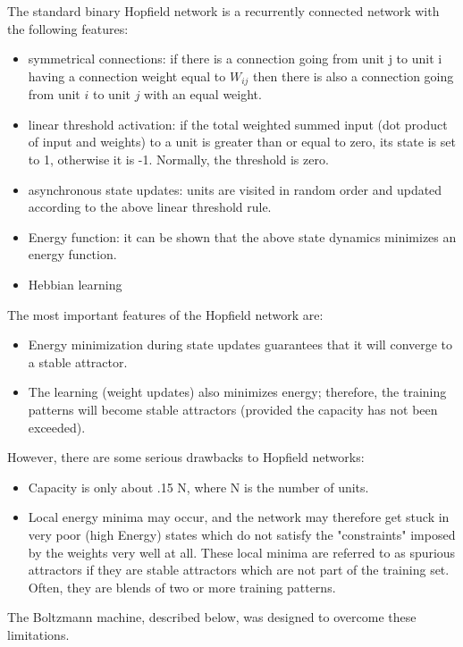 The standard binary Hopfield network is a recurrently connected network with the following features:
\begin{itemize}
\item symmetrical connections: if there is a connection going from unit j to unit i having a connection weight equal to $W_{ij}$ then there is also a connection going from unit $i$ to unit $j$ with an equal weight.
\item linear threshold activation: if the total weighted summed input (dot product of input and weights) to a unit is greater than or equal to zero, its state is set to 1, otherwise it is -1. Normally, the threshold is zero.
\item asynchronous state updates: units are visited in random order and updated according to the above linear threshold rule.
\item Energy function: it can be shown that the above state dynamics minimizes an energy function.
\item Hebbian learning
\end{itemize}

The most important features of the Hopfield network are:
\begin{itemize}
\item Energy minimization during state updates guarantees that it will converge to a stable attractor.
\item The learning (weight updates) also minimizes energy; therefore, the training patterns will become stable attractors (provided the capacity has not been exceeded).
\end{itemize}

However, there are some serious drawbacks to Hopfield networks:
\begin{itemize}
\item Capacity is only about .15 N, where N is the number of units.
\item Local energy minima may occur, and the network may therefore get stuck in very poor (high Energy) states which do not satisfy the "constraints" imposed by the weights very well at all. These local minima are referred to as spurious attractors if they are stable attractors which are not part of the training set. Often, they are blends of two or more training patterns.
\end{itemize}

The Boltzmann machine, described below, was designed to overcome these limitations.


